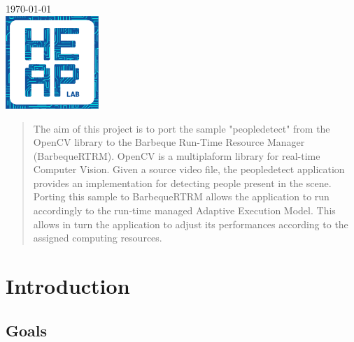 \begin{titlepage}

{\large \today}\\[2cm] %


\includegraphics[width=100pt]{heaplogo.pdf}\\[1cm] %
 

\vfill %

\end{titlepage}




\begin{abstract}
The aim of this project is to port the sample "peopledetect" from the
OpenCV library to the Barbeque Run-Time Resource Manager
(BarbequeRTRM).
OpenCV is a multiplaform library for real-time Computer Vision.
Given a source video file, the peopledetect application provides
an implementation for detecting people present in the scene.
Porting this sample to BarbequeRTRM allows the application to run
accordingly to the run-time managed Adaptive Execution Model.
This allows in turn the application to adjust its performances
according to the assigned computing resources.
\end{abstract}

\section{Introduction}

\subsection{Goals}


